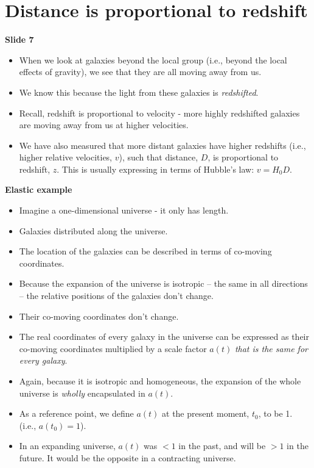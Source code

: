 \documentclass[11pt]{article}
\begin{document}
\section{Distance is proportional to redshift}
{\bf Slide 7}
\begin{itemize}
\item When we look at galaxies beyond the local group (i.e., beyond the local effects of gravity), we see that they are all moving away from us.
\item We know this because the light from these galaxies is {\it redshifted}.
\item Recall, redshift is proportional to velocity - more highly redshifted galaxies are moving away from us at higher velocities.
\item We have also measured that more distant galaxies have higher redshifts (i.e., higher relative velocities, $v$), such that distance, $D$, is proportional to redshift, $z$. This is usually expressing in terms of Hubble's law: $v = H_0D$.
\end{itemize}

\vspace{3mm}
\noindent
{\bf Elastic example}
\begin{itemize}
  \item Imagine a one-dimensional universe - it only has length.
  \item Galaxies distributed along the universe.
  \item The location of the galaxies can be described in terms of co-moving coordinates.
  \item Because the expansion of the universe is isotropic -- the same in all directions -- the relative positions of the galaxies don't change.
  \item Their co-moving coordinates don't change.
  \item The real coordinates of every galaxy in the universe can be expressed as their co-moving coordinates multiplied by a scale factor $a(t)$ {\it that is the same for every galaxy}.
  \item Again, because it is isotropic and homogeneous, the expansion of the whole universe is {\it wholly} encapsulated in $a(t)$.
  \item As a reference point, we define $a(t)$ at the present moment, $t_0$, to be 1. (i.e., $a(t_0)=1$).
  \item In an expanding universe, $a(t)$ was $<1$ in the past, and will be $>1$ in the future. It would be the opposite in a contracting universe.
\end{itemize}
\end{document}
